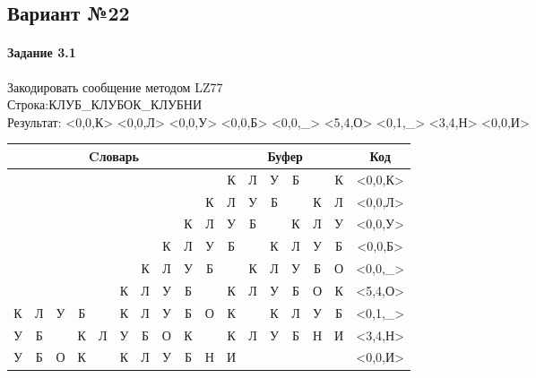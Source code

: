 \documentclass[a4paper, 12pt]{article}
\begin{document}
\pagebreak
\subsection{Вариант №22}
\paragraph{Задание 3.1}

Закодировать сообщение методом LZ77\\
Строка:КЛУБ\_КЛУБОК\_КЛУБНИ\\
Результат: <0,0,К> <0,0,Л> <0,0,У> <0,0,Б> <0,0,\_> <5,4,О> <0,1,\_> <3,4,Н> <0,0,И>\\
\begin{table}[h!]
\centering
\begin{tabular}{|c|c|c|c|c|c|c|c|c|c|c|c|c|c|c|c|c|} 
\hline
\multicolumn{10}{|c|}{Cловарь} & \multicolumn{6}{c|}{Буфер} & Код  \\ \hline
  &   &   &   &   &   &   &   &   &   & \cellcolor[HTML]{8CE4F6} К & Л & У & Б &   & К & <0,0,К>
\\ \hline
  &   &   &   &   &   &   &   &   & К & \cellcolor[HTML]{8CE4F6} Л & У & Б &   & К & Л & <0,0,Л>
\\ \hline
  &   &   &   &   &   &   &   & К & Л & \cellcolor[HTML]{8CE4F6} У & Б &   & К & Л & У & <0,0,У>
\\ \hline
  &   &   &   &   &   &   & К & Л & У & \cellcolor[HTML]{8CE4F6} Б &   & К & Л & У & Б & <0,0,Б>
\\ \hline
  &   &   &   &   &   & К & Л & У & Б & \cellcolor[HTML]{8CE4F6}   & К & Л & У & Б & О & <0,0,\_>
\\ \hline
  &   &   &   &   & \cellcolor[HTML]{FFFF00} К & \cellcolor[HTML]{FFFF00} Л & \cellcolor[HTML]{FFFF00} У & \cellcolor[HTML]{FFFF00} Б &   & \cellcolor[HTML]{FFFF00} К & \cellcolor[HTML]{FFFF00} Л & \cellcolor[HTML]{FFFF00} У & \cellcolor[HTML]{FFFF00} Б & \cellcolor[HTML]{8CE4F6} О & К & <5,4,О>
\\ \hline
\cellcolor[HTML]{FFFF00} К & Л & У & Б &   & К & Л & У & Б & О & \cellcolor[HTML]{FFFF00} К & \cellcolor[HTML]{8CE4F6}   & К & Л & У & Б & <0,1,\_>
\\ \hline
У & Б &   & \cellcolor[HTML]{FFFF00} К & \cellcolor[HTML]{FFFF00} Л & \cellcolor[HTML]{FFFF00} У & \cellcolor[HTML]{FFFF00} Б & О & К &   & \cellcolor[HTML]{FFFF00} К & \cellcolor[HTML]{FFFF00} Л & \cellcolor[HTML]{FFFF00} У & \cellcolor[HTML]{FFFF00} Б & \cellcolor[HTML]{8CE4F6} Н & И & <3,4,Н>
\\ \hline
У & Б & О & К &   & К & Л & У & Б & Н & \cellcolor[HTML]{8CE4F6} И &   &   &   &   &   & <0,0,И>
\\ \hline
\end{tabular}
\end{table}
\end{document}
